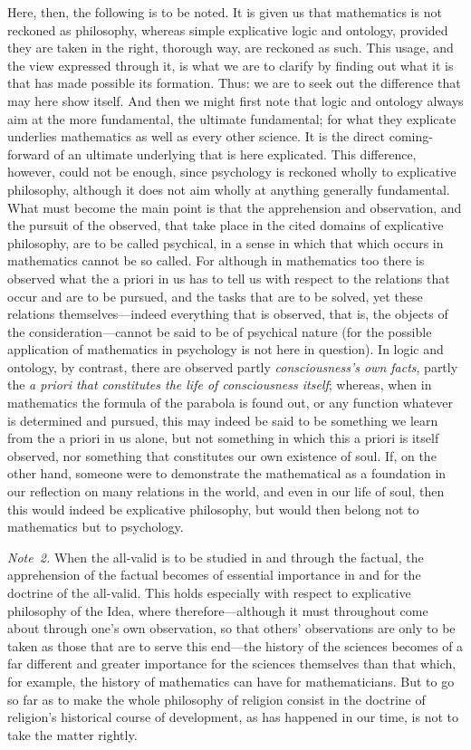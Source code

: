\documentclass[12pt,a4paper]{book}
\begin{document}
{\small Here, then, the following is to be noted. It is given us that mathematics
is not reckoned as philosophy, whereas simple explicative logic and ontology,
provided they are taken in the right, thorough way, are reckoned as such. This
usage, and the view expressed through it, is what we are to clarify by finding out
what it is that has made possible its formation. Thus: we are to seek out the
difference that may here show itself. And then we might first note that logic and
ontology always aim at the more fundamental, the ultimate fundamental; for what
they explicate underlies mathematics as well as every other science. It is the
direct coming-forward of an ultimate underlying that is here explicated. This
difference, however, could not be enough, since psychology is reckoned wholly to
explicative philosophy, although it does not aim wholly at anything generally
fundamental. What must become the main point is that the apprehension and
observation, and the pursuit of the observed, that take place in the cited domains
of explicative philosophy, are to be called psychical, in a sense in which that
which occurs in mathematics cannot be so called. For although in mathematics too
there is observed what the a priori in us has to tell us with respect to the
relations that occur and are to be pursued, and the tasks that are to be solved,
yet these relations themselves---indeed everything that is observed, that is, the
objects of the consideration---cannot be said to be of psychical nature (for the
possible application of mathematics in psychology is not here in question). In
logic and ontology, by contrast, there are observed partly
\emph{consciousness's own facts}, partly the \emph{a priori that constitutes the
life of consciousness itself}; whereas, when in mathematics the formula of the
parabola is found out, or any function whatever is determined and pursued, this may
indeed be said to be something we learn from the a priori in us alone, but not
something in which this a priori is itself observed, nor something that constitutes
our own existence of soul. If, on the other hand, someone were to demonstrate the
mathematical as a foundation in our reflection on many relations in the world, and
even in our life of soul, then this would indeed be explicative philosophy, but
would then belong not to mathematics but to psychology.\par}

{\small\emph{Note~2.} When the all-valid is to be studied in and through the
factual, the apprehension of the factual becomes of essential importance in and
for the doctrine of the all-valid. This holds especially with respect to
explicative philosophy of the Idea, where therefore---although it must throughout
come about through one's own observation, so that others' observations are only to
be taken as those that are to serve this end---the history of the sciences becomes
of a far different and greater importance for the sciences themselves than that
which, for example, the history of mathematics can have for mathematicians. But to
go so far as to make the whole philosophy of religion consist in the doctrine of
religion's historical course of development, as has happened in our time, is not to
take the matter rightly.\par}
\end{document}
